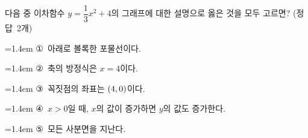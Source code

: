 다음 중 이차함수 $y=\dfrac{1}{3}x^2+4$의 그래프에 대한 설명으로 옳은 것을 모두 고르면? \mbox{(정답 2개)}
\par\medskip\par\noindent\hangindent=1.4em {\small ①}\ 아래로 볼록한 포물선이다.\par\noindent\hangindent=1.4em {\small ②}\ 축의 방정식은 $x=4$이다.\par\noindent\hangindent=1.4em {\small ③}\ 꼭짓점의 좌표는 $(4{,}\mkern3mu\mathopen{}0)$이다.\par\noindent\hangindent=1.4em {\small ④}\ $x>0$일 때, $x$의 값이 증가하면 $y$의 값도 증가한다.\par\noindent\hangindent=1.4em {\small ⑤}\ 모든 사분면을 지난다.\par\medskip

